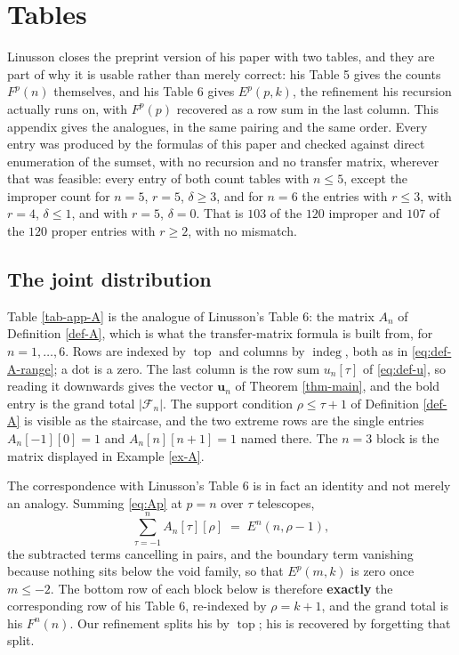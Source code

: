 \documentclass[11pt, a4paper, abstract=yes]{scrartcl}
\theoremstyle{definition}
\theoremstyle{remark}
\theoremstyle{plain}
\newcommand{\vek}[1]{\boldsymbol{#1}}
\newcommand{\indeg}{\operatorname{indeg}}
\newcommand{\tp}{\operatorname{top}}
\begin{document}
\appendix
\section{Tables}
\label{sec-app-tables}
\label{sec:app-tables}
Linusson closes the preprint version of his paper \autocite{Linusson1999preprint} with two tables,
and they are part of why it is usable rather than
merely correct: his Table 5 gives the counts \(F^p(n)\) themselves, and his Table 6 gives
\(E^p(p,k)\),
the refinement his recursion actually runs on, with \(F^p(p)\) recovered as a row sum in the last
column. This appendix gives the analogues, in the same pairing and the same order. Every entry
was produced by the formulas of this paper and checked against direct enumeration of the
sumset, with no recursion and no transfer matrix, wherever that was feasible: every entry of both
count tables with \(n\le5\), except the improper count for \(n=5\), \(r=5\), \(\delta\ge3\), and for
\(n=6\) the entries with \(r\le3\), with \(r=4\), \(\delta\le1\), and with \(r=5\), \(\delta=0\). That is
\(103\) of the \(120\) improper and \(107\) of the \(120\) proper entries with \(r\ge2\), with no
mismatch.
\subsection{The joint distribution}
\label{sec:orgc5b941c}

Table \ref{tab-app-A} is the analogue of Linusson's Table 6: the matrix \(A_n\) of
Definition \ref{def-A}, which is what the transfer-matrix formula is built from, for
\(n=1,\dots,6\). Rows are indexed by \(\tp\) and columns by \(\indeg\), both as in
\eqref{eq:def-A-range}; a dot is a zero. The last column is the row sum \(u_n[\tau]\) of
\eqref{eq:def-u}, so reading it downwards gives the vector \(\vek u_n\) of Theorem \ref{thm-main},
and the bold entry is the grand total \(\lvert\mathcal F_n\rvert\). The support condition
\(\rho\le\tau+1\) of Definition \ref{def-A} is visible as the staircase, and the two extreme rows
are the single entries \(A_n[-1][0]=1\) and \(A_n[n][n+1]=1\) named there. The \(n=3\) block is the
matrix displayed in Example \ref{ex-A}.

The correspondence with Linusson's Table 6 is in fact an identity and not merely an analogy.
Summing \eqref{eq:Ap} at \(p=n\) over \(\tau\) telescopes,
\begin{equation}\label{eq:colsum-is-E}
  \sum_{\tau=-1}^{n}A_n[\tau][\rho]\;=\;E^n(n,\rho-1) ,
\end{equation}
the subtracted terms cancelling in pairs, and the boundary term vanishing because nothing sits
below the void family, so that \(E^p(m,k)\) is zero once \(m\le-2\). The bottom row of each block
below is therefore \textbf{exactly} the corresponding row of his Table 6,
re-indexed by \(\rho=k+1\), and the grand total is his \(F^n(n)\). Our refinement splits his by
\(\tp\); his is recovered by forgetting that split.
\end{document}
